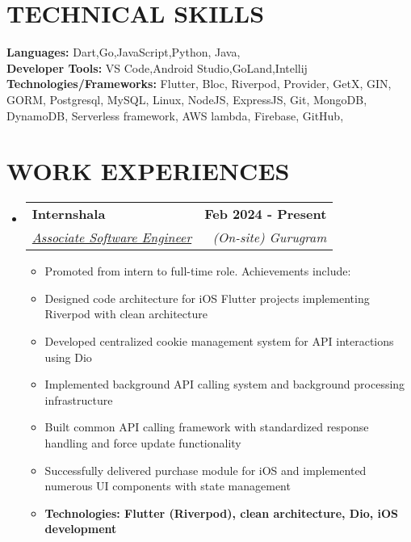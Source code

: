 \documentclass[letterpaper,11pt]{article}
\makeatletter
\newcommand{\resumeItem}[1]{
  \item\small{
    {#1 \vspace{-2pt}}
  }
}
\newcommand{\resumeSubheading}[4]{
  \vspace{-2pt}\item
    \begin{tabular*}{1.0\textwidth}[t]{l@{\extracolsep{\fill}}r}
      \textbf{\large#1} & \textbf{\small #2} \\
      \textit{\large#3} & \textit{\small #4} \\
      
    \end{tabular*}\vspace{-7pt}
}
\newcommand{\resumeSubHeadingListStart}{\begin{itemize}[leftmargin=0.0in, label={}]}
\newcommand{\resumeSubHeadingListEnd}{\end{itemize}}
\newcommand{\resumeItemListStart}{\begin{itemize}}
\newcommand{\resumeItemListEnd}{\end{itemize}\vspace{-5pt}}
\makeatother
\begin{document}
\section{TECHNICAL SKILLS}
 \begin{itemize}[leftmargin=0.15in, label={}]
    \small{\item{
     \textbf{\normalsize{Languages:}}{ \normalsize{Dart,Go,JavaScript,Python, Java,}} \\
     \textbf{\normalsize{Developer Tools:}}{ \normalsize{VS Code,Android Studio,GoLand,Intellij}} \\
     \textbf{\normalsize{Technologies/Frameworks:}}{\normalsize{ Flutter, Bloc, Riverpod, Provider, GetX, GIN, GORM, Postgresql, MySQL, Linux, NodeJS, ExpressJS, Git, MongoDB, DynamoDB, Serverless framework, AWS lambda, Firebase, GitHub,}} \\
    }}
 \end{itemize}
 \vspace{-15pt}




\section{WORK EXPERIENCES }

\resumeSubHeadingListStart

    \resumeSubheading
      {Internshala\href{https://internshala.com/}{\raisebox{-0.1\height}\faLink }}{Feb 2024 - Present} 
      {\underline{Associate Software Engineer}}{(On-site) Gurugram}
      \resumeItemListStart
        \resumeItem{\normalsize{Promoted from intern to full-time role. Achievements include:}}
        \resumeItem{\normalsize{Designed code architecture for iOS Flutter projects implementing Riverpod with clean architecture}}
        \resumeItem{\normalsize{Developed centralized cookie management system for API interactions using Dio}}
        \resumeItem{\normalsize{Implemented background API calling system and background processing infrastructure}}
        \resumeItem{\normalsize{Built common API calling framework with standardized response handling and force update functionality}}
        \resumeItem{\normalsize{Successfully delivered purchase module for iOS and implemented numerous UI components with state management}}
        \resumeItem{\normalsize{\textbf{Technologies: Flutter (Riverpod), clean architecture, Dio, iOS development}}}
      \resumeItemListEnd  
  \resumeSubHeadingListEnd
\end{document}
